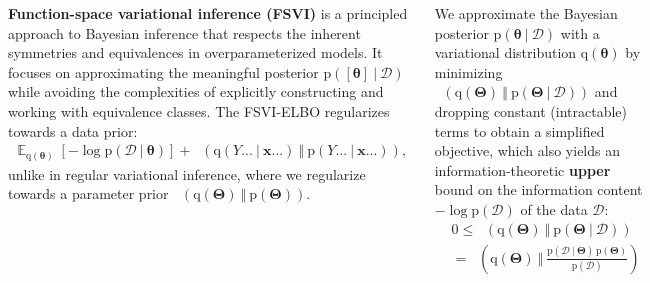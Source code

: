 \documentclass[25pt,a0paper,landscape]{tikzposter}
\DeclareMathOperator{\opExpectation}{\mathbb{E}}
\newcommand{\E}[2]{\opExpectation_{#1} \left [ #2 \right ]}
\newcommand{\MidSymbol}[1][]{\:#1\:}
\newcommand{\given}{\MidSymbol[\vert]}
\DeclareMathOperator{\opKale}{D_\mathrm{KL}}
\newcommand{\Kale}[2]{\opKale(#1 \MidSymbol[\Vert] #2)}
\newcommand{\opp}{\mathrm{p}}
\newcommand{\pof}[1]{\opp(#1)}
\newcommand{\opq}{\mathrm{q}}
\newcommand{\qof}[1]{\opq(#1)}
\newcommand{\w}{\boldsymbol{\theta}}
\newcommand{\W}{\boldsymbol{\Theta}}
\newcommand{\Dany}{\mathcal{D}}
\newcommand{\Y}{Y}
\newcommand{\x}{\boldsymbol{x}}
\begin{document}
\begin{columns}
\begin{subcolumns}
\end{subcolumns}
{
  \begin{tldrbox}
    \textbf{Function-space variational inference (FSVI)} is a principled approach to Bayesian inference that respects the inherent symmetries and equivalences in overparameterized models. It focuses on approximating the meaningful posterior $\pof{[\w] \given \Dany}$ while avoiding the complexities of explicitly constructing and working with equivalence classes.
    The FSVI-ELBO regularizes towards a data prior:
    \begin{align*}
    \E{\qof{\w}}{-\log \pof{\Dany \given \w}} + \Kale{\qof{\Y... \given \x...}}{\pof{\Y... \given \x...}},
    \end{align*}
    unlike in regular variational inference, where we regularize towards a parameter prior $\Kale{\qof{\W}}{\pof{\W}}$.
  \end{tldrbox}
  \begin{multicols}{2}
    \begin{backgroundbox}[title=(Regular) Variational Inference \& ELBO]
      We approximate the Bayesian posterior $\pof{\w \given \Dany}$ with a variational distribution $\qof{\w}$ by minimizing $\Kale{\qof{\W}}{\pof{\W \given \Dany}}$ and dropping constant (intractable) terms to obtain a simplified objective, which also yields an information-theoretic \textbf{upper} bound on the information content $-\log \pof{\Dany}$ of the data $\Dany$:
      \begin{align*}
      & 0 \le \Kale{\qof{\W}}{\pof{\W \given \Dany}} \\
      &= \Kale{\qof{\W}}{\frac{\pof{\Dany \given \W}\,\pof{\W}}{\pof{\Dany}}}\\

\end{align*}
\end{backgroundbox}
\end{multicols}}
\end{columns}
\end{document}
